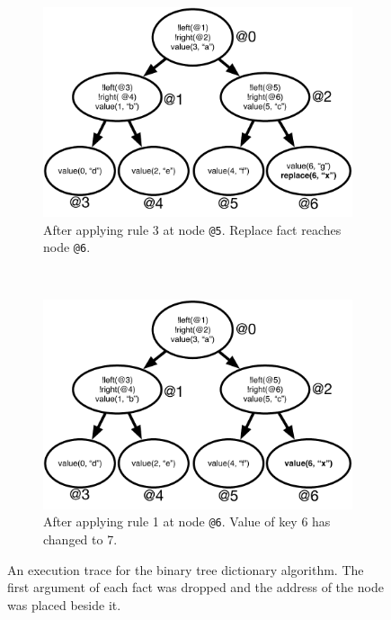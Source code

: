 \begin{figure}[h]
        \begin{subfigure}[b]{0.5\textwidth}
                \includegraphics[width=\textwidth]{figures/btree/btree_trace3}
                \caption{After applying rule 3 at node \texttt{@5}. Replace fact
                   reaches node \texttt{@6}.}
                \label{fig:btree_trace3}
        \end{subfigure}%
        ~
        \begin{subfigure}[b]{0.5\textwidth}
                  \includegraphics[width=\textwidth]{figures/btree/btree_trace4}
                  \caption{After applying rule 1 at node \texttt{@6}. Value of key 6 has changed to 7.}
                  \label{fig:btree_trace4}
          \end{subfigure}
        \caption{An execution trace for the binary tree dictionary
           algorithm. The first argument of each fact was dropped and the
           address of the node was placed beside it.}\label{fig:btree_trace}
\end{figure}

